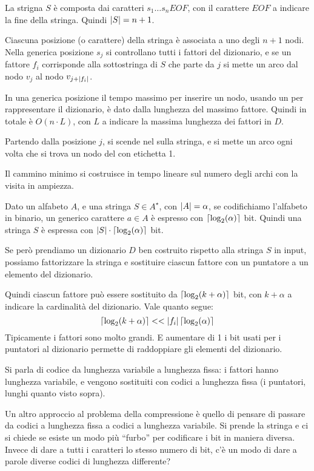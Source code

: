 La strigna $S$ \`e composta dai caratteri $s_1 \ldots s_n EOF$, con il carattere $EOF$ a indicare la fine della stringa. Quindi $\left\lvert{S}\right\rvert = n+1$.

Ciascuna posizione (o carattere) della stringa \`e associata a uno degli $n+1$ nodi. Nella generica posizione $s_j$ si controllano tutti i fattori del dizionario, e se un fattore $f_i$ corrisponde alla sottostringa di $S$ che parte da $j$ si mette un arco dal nodo $v_{j}$ al nodo $v_{j + \left\lvert{f_i}\right\rvert}$.

In una generica posizione il tempo massimo per inserire un nodo, usando un  per rappresentare il dizionario, \`e dato dalla lunghezza del massimo fattore. Quindi in totale \`e $O(n \cdot L)$, con $L$ a indicare la massima lunghezza dei fattori in $D$.

Partendo dalla posizione $j$, si scende nel  sulla stringa, e si mette un arco ogni volta che si trova un nodo del  con etichetta 1.

Il cammino minimo si costruisce in tempo lineare sul numero degli archi con la visita in ampiezza.

Dato un alfabeto $A$, e una stringa $S \in A^{\star}$, con $\left\lvert{A}\right\rvert = \alpha$, se codifichiamo l'alfabeto in binario, un generico carattere $a \in A$ \`e espresso con $\left\lceil{\log_2 (\alpha)}\right\rceil$ bit. Quindi una stringa $S$ \`e espressa con $\left\lvert{S}\right\rvert \cdot \left\lceil{\log_2 (\alpha)}\right\rceil$ bit.

Se per\`o prendiamo un dizionario $D$ ben costruito rispetto alla stringa $S$ in input, possiamo fattorizzare la stringa e sostituire ciascun fattore con un puntatore a un elemento del dizionario.

Quindi ciascun fattore pu\`o essere sostituito da $\left\lceil{\log_2 (k + \alpha)}\right\rceil$ bit, con $k + \alpha$ a indicare la cardinalit\`a del dizionario. Vale quanto segue:
\[
\left\lceil{\log_2 (k + \alpha)}\right\rceil << \left\lvert{f_i}\right\rvert \left\lceil{\log_2 (\alpha)}\right\rceil
\]
Tipicamente i fattori sono molto grandi. E aumentare di 1 i bit usati per i puntatori al dizionario permette di raddoppiare gli elementi del dizionario.

Si parla di codice da lunghezza variabile a lunghezza fissa: i fattori hanno lunghezza variabile, e vengono sostituiti con codici a lunghezza fissa (i puntatori, lunghi quanto visto sopra).

Un altro approccio al problema della compressione \`e quello di pensare di passare da codici a lunghezza fissa a codici a lunghezza variabile. Si prende la stringa e ci si chiede se esiste un modo pi\`u ``furbo'' per codificare i bit in maniera diversa. Invece di dare a tutti i caratteri lo stesso numero di bit, c'\`e un modo di dare a parole diverse codici di lunghezza differente?

